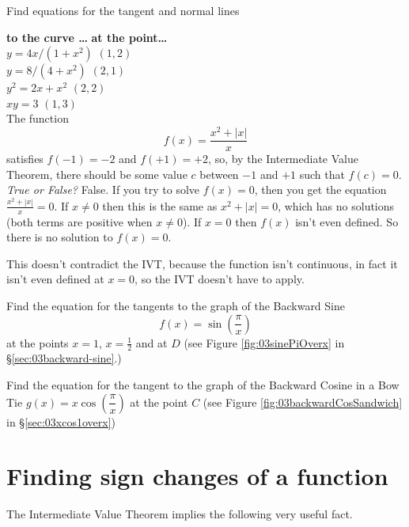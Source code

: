\begin{multicols}{2}
\problem Find equations for the tangent and normal lines %




\textbf{to the curve \ldots} \hfill \textbf{at the point\ldots}\\
\subprob $y=4x/(1+x^2) $ \hfill $(1, 2)$\\
\subprob $y=8/(4+x^2) $ \hfill $(2, 1)$\\
\subprob $y^2=2x+x^2$ \hfill $(2, 2)$\\
\subprob $xy=3$ \hfill $(1, 3)$\\












\problem \groupproblem The function $$f(x) = \frac{x^2+|x|}{x}$$ satisfies $f(-1) = %
-2$ and $f(+1) = +2$, so, by the Intermediate Value Theorem,
there should be some value $c$ between $-1$ and $+1$ such that
$f(c) = 0$.  \emph{True or False?}
\answer %
False.  If you try to solve $f(x) = 0$, then you get the equation
$\frac{x^2+|x|}{x}=0$.  If $x\ne0$ then this is the same as
$x^2+|x|=0$, which has no solutions (both terms are positive when
$x\ne0$).  If $x=0$ then $f(x)$ isn't even defined.
So there is no solution to $f(x) = 0$.




This doesn't contradict the IVT, because the function isn't
continuous, in fact it isn't even defined at $x=0$, so the IVT
doesn't have to apply.  
\endanswer


\problem Find the equation for the tangents to the graph of the Backward Sine %
\[
  f(x)=\sin\left(\dfrac{\pi}{x}\right)
\]
at the points $x=1$, $x=\frac12$ and at $D$  (see Figure \ref{fig:03sinePiOverx}
in \S\ref{sec:03backward-sine}.)




\problem Find the equation for the tangent to the graph of the Backward Cosine %
in a Bow Tie $g(x)=x\cos\left(\dfrac{\pi}{x}\right)$ at the point $C$  (see Figure
\ref{fig:03backwardCosSandwich} in \S\ref{sec:03xcos1overx})
\end{multicols}




\noproblemfont

\section{Finding sign changes of a function}\label{sec:sign-changes} %
The Intermediate Value Theorem implies the following very useful fact.

